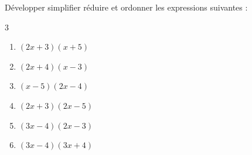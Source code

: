 \documentclass[main.tex]{subfiles}
\begin{document}
\begin{exercise} \label{chap07:exo:double} Développer simplifier réduire et ordonner les expressions suivantes :
	\vspace{-0.5em}
	\begin{multicols}{3}
		\begin{enumerate}[label={$\Alph*=$},leftmargin=*]
			\item $ \left(2x+3\right)\left(x+5\right)$
			\item $ \left(2x+4\right)\left(x-3\right)$
			\item $ \left(x-5\right)\left(2x-4\right)$
			\item $ \left(2x+3\right)\left(2x-5\right)$
			\item $ \left(3x-4\right)\left(2x-3\right)$ 
			\item $ \left(3x-4\right)\left(3x+4\right)$ 
		\end{enumerate}
	\end{multicols} 
\end{exercise}
\end{document}
